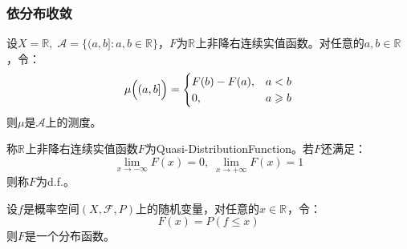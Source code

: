 \subsubsection{依分布收敛}
\begin{theorem}
	设$X=\mathbb{R},\;\mathscr{A}=\{(a,b]:a,b\in\mathbb{R}\}$，$F$为$\mathbb{R}^{}$上非降右连续实值函数。对任意的$a,b\in\mathbb{R}$，令：
	\begin{equation*}
		\mu\Bigl((a,b]\Bigr)=
		\begin{cases}
			F(b)-F(a),&a<b \\
			0,&a\geqslant b
		\end{cases}
	\end{equation*}
	则$\mu$是$\mathscr{A}$上的测度。
\end{theorem}
\begin{definition}
	称$\mathbb{R}^{}$上非降右连续实值函数$F$为\gls{Quasi-DistributionFunction}。若$F$还满足：
	\begin{equation*}
		\lim_{x\to-\infty}F(x)=0,\;\lim_{x\to+\infty}F(x)=1
	\end{equation*}
	则称$F$为\gls{d.f.}。
\end{definition}
\begin{theorem}
	设$f$是概率空间$(X,\mathscr{F},P)$上的随机变量，对任意的$x\in\mathbb{R}^{}$，令：
	\begin{equation*}
		F(x)=P(f\leqslant x)
	\end{equation*}
	则$F$是一个分布函数。
\end{theorem}
